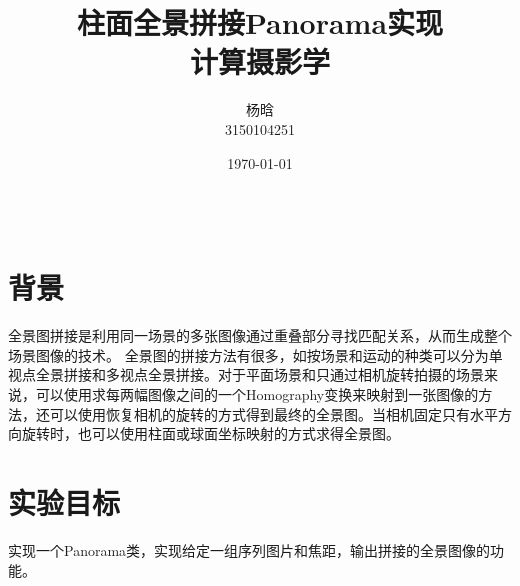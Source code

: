 \documentclass{article}
\title{柱面全景拼接Panorama实现 \\ 计算摄影学} %
\author{杨晗 \\ 3150104251} %
\date{\today} %
\begin{document}
\maketitle %

\begin{center}
\begin{tabular}{l r}
\end{tabular}
\end{center}




\section{背景}

全景图拼接是利用同一场景的多张图像通过重叠部分寻找匹配关系，从而生成整个场景图像的技术。 全景图的拼接方法有很多，如按场景和运动的种类可以分为单视点全景拼接和多视点全景拼接。对于平面场景和只通过相机旋转拍摄的场景来说，可以使用求每两幅图像之间的一个Homography变换来映射到一张图像的方法，还可以使用恢复相机的旋转的方式得到最终的全景图。当相机固定只有水平方向旋转时，也可以使用柱面或球面坐标映射的方式求得全景图。


\section{实验目标}
实现一个Panorama类，实现给定一组序列图片和焦距，输出拼接的全景图像的功能。
 
\end{document}
